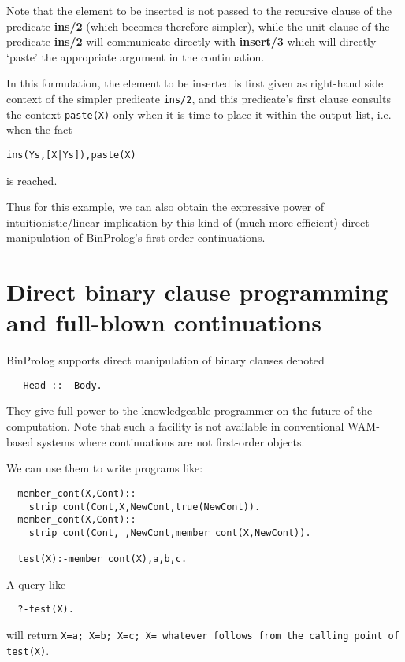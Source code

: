 \documentclass{article}
\begin{document}
{\flushleft Note} that the element to be inserted is not passed to the recursive
clause of the predicate {\bf ins/2} (which becomes therefore simpler),
while the unit clause of the predicate {\bf ins/2} will communicate
directly with {\bf insert/3} which will directly `paste' the appropriate
argument in the continuation.
 
In this formulation, the element to be inserted is first given as
right-hand side context of the simpler predicate {\tt ins/2}, and this predicate's
first clause consults the context {\tt paste(X)} only when it is time to place it within the output list,
i.e. when the fact 
\begin{verbatim}
ins(Ys,[X|Ys]),paste(X)
\end{verbatim}
is reached. 

Thus for this example, we can also obtain the expressive power of
intuitionistic/linear implication
by this kind of (much more efficient)
direct manipulation of BinProlog's
first order continuations.

\section{Direct binary clause programming and full-blown continuations}

BinProlog  supports direct manipulation of binary clauses
denoted 

\begin{verbatim}
   Head ::- Body.
\end{verbatim}

{\flushleft They} give full power to the knowledgeable programmer on
the future of the computation. Note that such a facility is not
available in conventional WAM-based systems where continuations
are not first-order objects.

We can use them to write programs like:

{\small
\begin{verbatim}
  member_cont(X,Cont)::-
    strip_cont(Cont,X,NewCont,true(NewCont)).
  member_cont(X,Cont)::-
    strip_cont(Cont,_,NewCont,member_cont(X,NewCont)).

  test(X):-member_cont(X),a,b,c.
\end{verbatim}
}

{\flushleft A} query like
{\small
\begin{verbatim}
  ?-test(X).
\end{verbatim}
}

{\flushleft will} return {\tt X=a; X=b; X=c; X= whatever follows from the calling point of test(X)}. 
\end{document}
